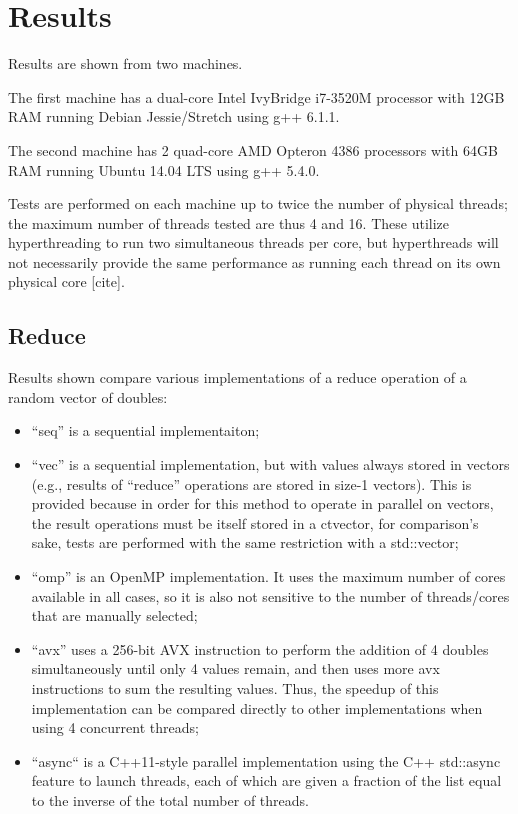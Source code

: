 \chapter{Results}

Results are shown from two machines.

The first machine has a dual-core Intel IvyBridge i7-3520M processor with 12GB
RAM running Debian Jessie/Stretch using g++ 6.1.1.

The second machine has 2 quad-core AMD Opteron 4386 processors with 64GB RAM
running Ubuntu 14.04 LTS using g++ 5.4.0.

Tests are performed on each machine up to twice the number of physical threads;
the maximum number of threads tested are thus 4 and 16. These utilize hyperthreading
to run two simultaneous threads per core, but hyperthreads will not necessarily
provide the same performance as running each thread on its own physical core [cite].



\section{Reduce}
Results shown compare various implementations of a reduce operation of a random
vector of doubles:

\begin{itemize}
 \item ``seq'' is a sequential implementaiton;
 \item ``vec'' is a sequential implementation, but with values always stored in
 vectors (e.g., results of ``reduce'' operations are stored in size-1 vectors).
 This is provided because in order for this method to operate in parallel on
 vectors, the result operations must be itself stored in a ctvector, for
 comparison's sake, tests are performed with the same restriction with a
 std::vector;
 \item ``omp'' is an OpenMP implementation. It uses the maximum number of cores
 available in all cases, so it is also not sensitive to the number of
 threads/cores that are manually selected;
 \item ``avx'' uses a 256-bit AVX instruction to perform the addition of 4 doubles
 simultaneously until only 4 values remain, and then uses more avx instructions
 to sum the resulting values. Thus, the speedup of this implementation can be
 compared directly to other implementations when using 4 concurrent threads;
 \item ``async`` is a C++11-style parallel implementation using the C++ std::async
 feature to launch threads, each of which are given a fraction of the list equal
 to the inverse of the total number of threads.
\end{itemize}

